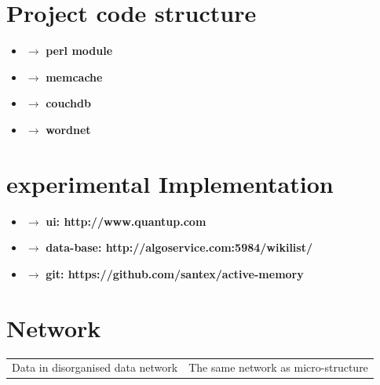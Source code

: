 \documentclass[15pt]{article}
\begin{document}
\vskip 1cm




\section{Project code structure}

\begin{itemize}
\item $\rightarrow$ \textbf{perl module}
\item $\rightarrow$ \textbf{memcache}
\item $\rightarrow$ \textbf{couchdb}
\item $\rightarrow$ \textbf{wordnet}
\end{itemize}   



\section{experimental Implementation}

\begin{itemize}
\item $\rightarrow$ \textbf{ui: http://www.quantup.com}
\item $\rightarrow$ \textbf{data-base: http://algoservice.com:5984/wikilist/}
\item $\rightarrow$ \textbf{git: https://github.com/santex/active-memory}

\end{itemize}   

\section{Network}
    
   \begin{tabular}{cc}
    Data in disorganised data network         &    The same network as micro-structure\\
    
    \end{tabular}
\end{document}

